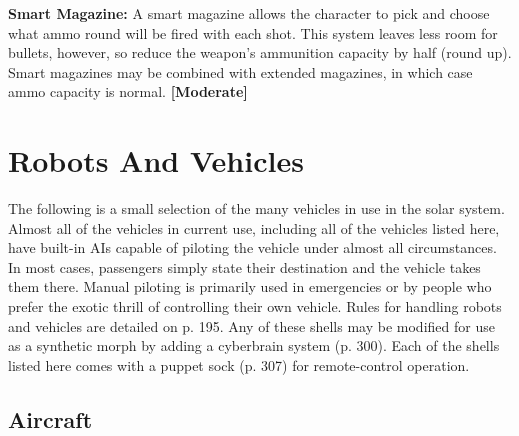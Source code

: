 \textbf{Smart Magazine:} A smart magazine allows the 
character to pick and choose what ammo round will 
be fired with each shot. This system leaves less room 
for bullets, however, so reduce the weapon's ammunition
capacity by half (round up). Smart magazines
may be combined with extended magazines, in which 
case ammo capacity is normal. \textbf{[Moderate]}

\section{Robots And Vehicles}

The following is a small selection of the many vehicles 
in use in the solar system. Almost all of the vehicles 
in current use, including all of the vehicles listed here, 
have built-in AIs capable of piloting the vehicle under 
almost all circumstances. In most cases, passengers 
simply state their destination and the vehicle takes 
them there. Manual piloting is primarily used in 
emergencies or by people who prefer the exotic thrill 
of controlling their own vehicle.
Rules for handling robots and vehicles are detailed 
on p. 195. Any of these shells may be modified for use 
as a synthetic morph by adding a cyberbrain system 
(p. 300). Each of the shells listed here comes with a 
puppet sock (p. 307) for remote-control operation.

\subsection{Aircraft}

